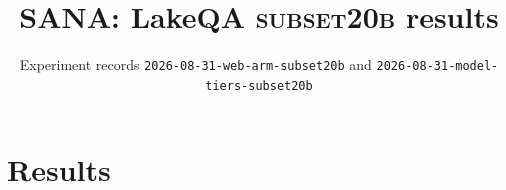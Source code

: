 \documentclass[10pt]{article}
\title{SANA: LakeQA \textsc{subset20b} results}
\author{Experiment records \texttt{2026-08-31-web-arm-subset20b} and \texttt{2026-08-31-model-tiers-subset20b}}
\date{}
\begin{document}
\maketitle
\section{Results}

\clearpage

\end{document}
